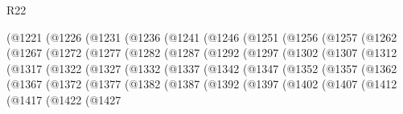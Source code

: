 \begin{lexlean}{R22}
\begin{coremodule}
            (@1221
              (@1226
                (@1231
                  (@1236
                    (@1241
                      (@1246
                        (@1251
                          (@1256
                            (@1257
                              (@1262
                                (@1267
                                  (@1272
                                    (@1277
                                      (@1282
                                        (@1287
                                          (@1292
                                            (@1297
                                              (@1302
                                                (@1307
                                                  (@1312
                                                    (@1317
                                                      (@1322
                                                        (@1327
                                                          (@1332
                                                            (@1337
                                                              (@1342
                                                                (@1347
                                                                  (@1352
                                                                    (@1357
                                                                      (@1362
                                                                        (@1367
                                                                          (@1372
                                                                            (@1377
                                                                              (@1382
                                                                                (@1387
                                                                                  (@1392
                                                                                    (@1397
                                                                                      (@1402
                                                                                        (@1407
                                                                                          (@1412
                                                                                            (@1417
                                                                                              (@1422
                                                                                                (@1427

\end{coremodule}
\end{lexlean}
